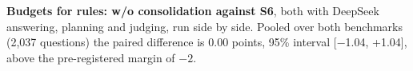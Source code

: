 \begin{gentable}
\centering
\small
\caption{\textbf{Budgets for rules: \sys{} w/o consolidation against S6}, both with DeepSeek answering, planning and judging, run side by side. Pooled over both benchmarks (2,037 questions) the paired difference is 0.00 points, 95\% interval [$-$1.04, +1.04], above the pre-registered margin of $-2$.}
\label{tab:simple}
\setlength{\tabcolsep}{3.5pt}
\end{gentable}
